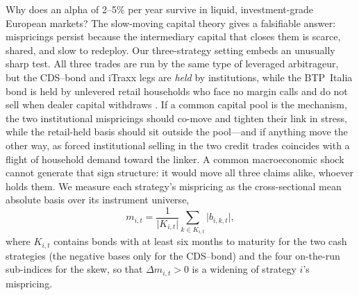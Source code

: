 
Why does an alpha of 2--5\% per year survive in liquid, investment-grade
European markets? The slow-moving capital theory
\citep{duffie2010presidential, brunnermeier2009market, mitchell2012arbitrage}
gives a falsifiable answer: mispricings persist because the intermediary
capital that closes them is scarce, shared, and slow to redeploy. Our
three-strategy setting embeds an unusually sharp test. All three trades are
run by the same type of leveraged arbitrageur, but the CDS--bond and iTraxx
legs are \emph{held} by institutions, while the BTP~Italia bond is held by
unlevered retail households who face no margin calls and do not sell when
dealer capital withdraws \citep{vayanos2021preferred}. If a common capital
pool is the mechanism, the two institutional mispricings should co-move and
tighten their link in stress, while the retail-held basis should sit outside
the pool---and if anything move the other way, as forced institutional selling
in the two credit trades coincides with a flight of household demand toward
the linker. A common macroeconomic shock cannot generate that sign structure:
it would move all three claims alike, whoever holds them. We measure each
strategy's mispricing as the cross-sectional mean absolute basis over its
instrument universe,
\begin{equation}
m_{i,t}=\frac{1}{\lvert K_{i,t}\rvert}\sum_{k\in K_{i,t}}
\bigl\lvert b_{i,k,t}\bigr\rvert,
\end{equation}
where $K_{i,t}$ contains bonds with at least six months to maturity for the
two cash strategies (the negative bases only for the CDS--bond) and the four
on-the-run sub-indices for the skew, so that $\Delta m_{i,t}>0$ is a widening
of strategy $i$'s mispricing.


